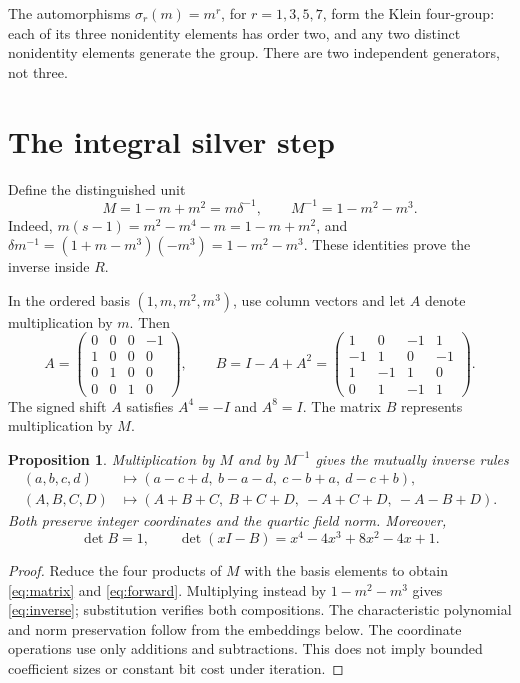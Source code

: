\documentclass[11pt,a4paper]{article}
\newtheorem{proposition}{Proposition}
\begin{document}
The automorphisms $\sigma_r(m)=m^r$, for $r=1,3,5,7$, form the
Klein four-group: each of its three nonidentity elements has order
two, and any two distinct nonidentity elements generate the group.
There are two independent generators, not three.

\section{The integral silver step}\label{sec:step}
Define the distinguished unit
\begin{equation}\label{eq:unit}
 M=1-m+m^2=m\delta^{-1},\qquad M^{-1}=1-m^2-m^3.
\end{equation}
Indeed, $m(s-1)=m^2-m^4-m=1-m+m^2$, and
$\delta m^{-1}=(1+m-m^3)(-m^3)=1-m^2-m^3$.
These identities prove the inverse inside $R$.

In the ordered basis $(1,m,m^2,m^3)$, use column vectors and let
$A$ denote multiplication by $m$. Then
\begin{equation}\label{eq:matrix}
 A=\begin{pmatrix}0&0&0&-1\\1&0&0&0\\0&1&0&0\\0&0&1&0\end{pmatrix},
 \qquad B=I-A+A^2=
 \begin{pmatrix}1&0&-1&1\\-1&1&0&-1\\1&-1&1&0\\0&1&-1&1\end{pmatrix}.
\end{equation}
The signed shift $A$ satisfies $A^4=-I$ and $A^8=I$.
The matrix $B$ represents multiplication by $M$.

\begin{proposition}\label{prop:step}
Multiplication by $M$ and by $M^{-1}$ gives the mutually inverse rules
\begin{align}
 (a,b,c,d)&\longmapsto(a-c+d,\ b-a-d,\ c-b+a,\ d-c+b),\label{eq:forward}\\
 (A,B,C,D)&\longmapsto(A+B+C,\ B+C+D,\ -A+C+D,\ -A-B+D).\label{eq:inverse}
\end{align}
Both preserve integer coordinates and the quartic field norm.
Moreover,
\begin{equation}\label{eq:charpoly}
 \det B=1,\qquad \det(xI-B)=x^4-4x^3+8x^2-4x+1.
\end{equation}
\end{proposition}
\begin{proof}
Reduce the four products of $M$ with the basis elements to obtain
\eqref{eq:matrix} and \eqref{eq:forward}. Multiplying instead by
$1-m^2-m^3$ gives \eqref{eq:inverse}; substitution verifies both
compositions. The characteristic polynomial and norm preservation
follow from the embeddings below. The coordinate operations use
only additions and subtractions. This does not imply bounded
coefficient sizes or constant bit cost under iteration.
\end{proof}
\end{document}

